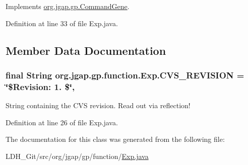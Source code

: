 Implements \hyperlink{classorg_1_1jgap_1_1gp_1_1_command_gene_a236141d99059da808afe7a9217e411c7}{org.\-jgap.\-gp.\-Command\-Gene}.



Definition at line 33 of file Exp.\-java.



\subsection{Member Data Documentation}
\hypertarget{classorg_1_1jgap_1_1gp_1_1function_1_1_exp_a1b86feb19be9dc6a3b59e509bedaf86b}{
\subsubsection[{C\-V\-S\-\_\-\-R\-E\-V\-I\-S\-I\-O\-N}]{\setlength{\rightskip}{0pt plus 5cm}final String org.\-jgap.\-gp.\-function.\-Exp.\-C\-V\-S\-\_\-\-R\-E\-V\-I\-S\-I\-O\-N = \char`\"{}\$Revision\-: 1. \$\char`\"{}\hspace{0.3cm}{\ttfamily [static]}, {\ttfamily [private]}}}\label{classorg_1_1jgap_1_1gp_1_1function_1_1_exp_a1b86feb19be9dc6a3b59e509bedaf86b}
String containing the C\-V\-S revision. Read out via reflection! 

Definition at line 26 of file Exp.\-java.



The documentation for this class was generated from the following file\-:\begin{DoxyCompactItemize}
\item 
L\-D\-H\-\_\-\-Git/src/org/jgap/gp/function/\hyperlink{_exp_8java}{Exp.\-java}\end{DoxyCompactItemize}
